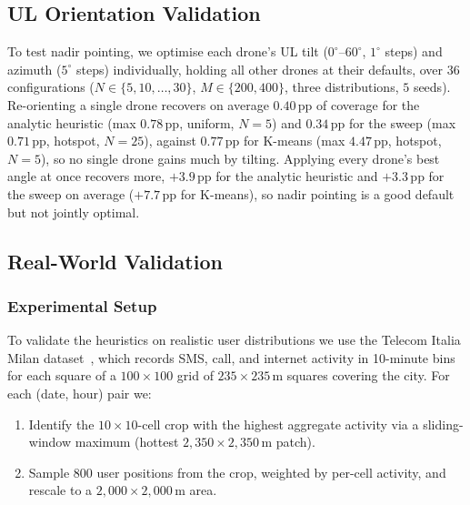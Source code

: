 \documentclass[conference]{IEEEtran}
\begin{document}
\subsection{UL Orientation Validation}
\label{sec:orientation_validation}

To test nadir pointing, we optimise each drone's UL tilt ($0^\circ$--$60^\circ$, $1^\circ$ steps) and azimuth ($5^\circ$ steps) individually, holding all other drones at their defaults, over 36 configurations ($N \in \{5,10,\ldots,30\}$, $M \in \{200, 400\}$, three distributions, $5$ seeds). Re-orienting a single drone recovers on average $0.40$\,pp of coverage for the analytic heuristic (max $0.78$\,pp, uniform, $N{=}5$) and $0.34$\,pp for the sweep (max $0.71$\,pp, hotspot, $N{=}25$), against $0.77$\,pp for K-means (max $4.47$\,pp, hotspot, $N{=}5$), so no single drone gains much by tilting. Applying every drone's best angle at once recovers more, $+3.9$\,pp for the analytic heuristic and $+3.3$\,pp for the sweep on average ($+7.7$\,pp for K-means), so nadir pointing is a good default but not jointly optimal.



\subsection{Real-World Validation}
\label{sec:results_telecom}

\subsubsection{Experimental Setup}

To validate the heuristics on realistic user distributions we use the Telecom Italia
Milan dataset~\cite{barlacchi2015,telecomitalia2015milan}, which records SMS, call, and internet activity
in 10-minute bins for each square of a $100 \times 100$ grid of $235 \times 235$\,m
squares covering the city. For each (date, hour) pair we:
\begin{enumerate}[label=(\alph*)]
    \item Identify the $10 \times 10$-cell crop with the highest aggregate activity
          via a sliding-window maximum (hottest $2{,}350 \times 2{,}350$\,m patch).
    \item Sample 800 user positions from the crop, weighted by per-cell activity,
          and rescale to a $2{,}000 \times 2{,}000$\,m area.
\end{enumerate}
\end{document}
